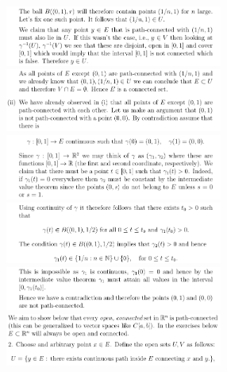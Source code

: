 \documentclass[8pt,landscape]{article}
\begin{document}
\begin{multicols}{3}
    \includegraphics[width=270]{140.png} \\
    \includegraphics[width=270]{141.png} \\
    \includegraphics[width=270]{142.png} \\
    \includegraphics[width=270]{143.png} \\
    \includegraphics[width=270]{144.png} \\
    \includegraphics[width=270]{145.png} \\

\end{multicols}
\end{document}
